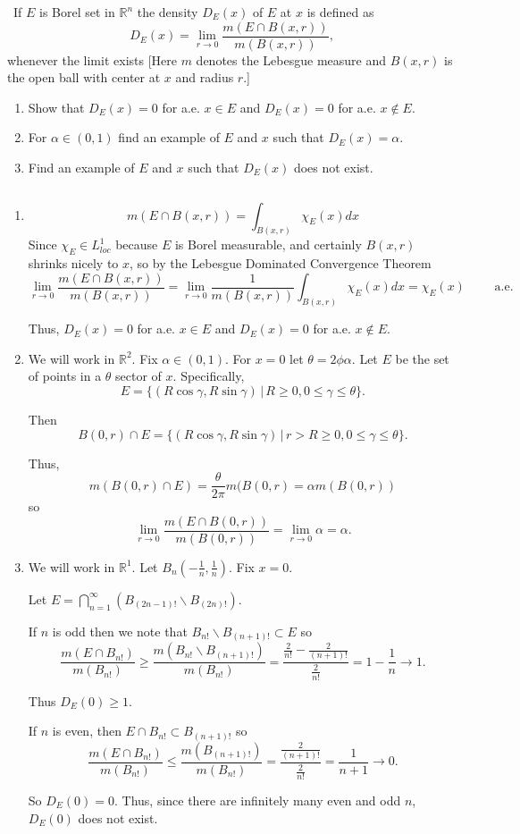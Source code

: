 \documentclass[12pt]{Homework}
\begin{document}
\begin{problem}[Folland, 3.4.25, p.100] $\,$
If $E$ is Borel set in $\mathbb{R}^n$ the density $D_E(x)$ of $E$ at $x$ is defined as $$D_E(x)=\lim_{r\to 0}\frac{m(E\cap B(x,r))}{m(B(x,r))},$$ whenever the limit exists [Here $m$ denotes the Lebesgue measure and $B(x,r)$ is the open ball with center at $x$ and radius $r.$]
\begin{enumerate}[label=(\alph*)]
    \item Show that $D_E(x)=0$ for a.e. $x\in E$ and $D_E(x)=0$ for a.e. $x\notin E$.
    \item For $\alpha\in (0,1)$ find an example of $E$ and $x$ such that $D_E(x)=\alpha$.
    \item Find an example of $E$ and $x$ such that $D_E(x)$ does not exist.
\end{enumerate}
\end{problem}


\begin{solution}$\,$
\begin{enumerate}[label=(\alph*)]
    \item $$m(E\cap B(x,r))=\int_{B(x,r)}\chi_E(x)dx$$ Since $\chi_E\in L_{loc}^1$ because $E$ is Borel measurable, and certainly $B(x,r)$ shrinks nicely to $x$, so by the Lebesgue Dominated Convergence Theorem $$\lim_{r\to0}\frac{m(E\cap B(x,r))}{m(B(x,r))}=\lim_{r\to0}\frac{1}{m(B(x,r))}\int_{B(x,r)}\chi_E(x)dx=\chi_E(x)\qquad\text{ a.e.}$$
    
    Thus, $D_E(x)=0$ for a.e. $x\in E$ and $D_E(x)=0$ for a.e. $x\notin E$.
    \item We will work in $\mathbb{R}^2$. Fix $\alpha\in(0,1)$. For $x=0$ let $\theta=2\phi\alpha$. Let $E$ be the set of points in a $\theta$ sector of $x$. Specifically, $$E=\{(R\cos\gamma,R\sin\gamma)\,|\,R\ge0,0\le\gamma\le\theta\}.$$
    
    Then $$B(0,r)\cap E=\{(R\cos\gamma,R\sin\gamma)\,|\,r>R\ge0,0\le\gamma\le\theta\}.$$
    
    Thus, $$m(B(0,r)\cap E)=\frac{\theta}{2\pi}m(B(0,r)=\alpha m(B(0,r))$$ so $$\lim_{r\to 0}\frac{m(E\cap B(0,r))}{m(B(0,r))}=\lim_{r\to0}\alpha=\alpha.$$
    \item We will work in $\mathbb{R}^1$. Let $B_n(-\frac{1}{n},\frac{1}{n})$. Fix $x=0$.
    
    Let $E=\bigcap_{n=1}^\infty(B_{(2n-1)!}\backslash B_{(2n)!}).$
    
    If $n$ is odd then we note that $B_{n!}\backslash B_{(n+1)!}\subset E$ so $$\frac{m(E\cap B_{n!})}{m(B_{n!})}\ge\frac{m(B_{n!}\backslash B_{(n+1)!})}{m(B_{n!})}=\frac{\frac{2}{n!}-\frac{2}{(n+1)!}}{\frac{2}{n!}}=1-\frac{1}{n}\to1.$$
    
    Thus $D_E(0)\ge1.$
    
    If $n$ is even, then $E\cap B_{n!}\subset B_{(n+1)!}$ so $$\frac{m(E\cap B_{n!})}{m(B_{n!})}\le\frac{m(B_{(n+1)!})}{m(B_{n!})}=\frac{\frac{2}{(n+1)!}}{\frac{2}{n!}}=\frac{1}{n+1}\to0.$$
    
    So $D_E(0)=0$. Thus, since there are infinitely many even and odd $n$, $D_E(0)$ does not exist.
\end{enumerate}
\end{solution}
\vspace{0.5cm}
\end{document}
